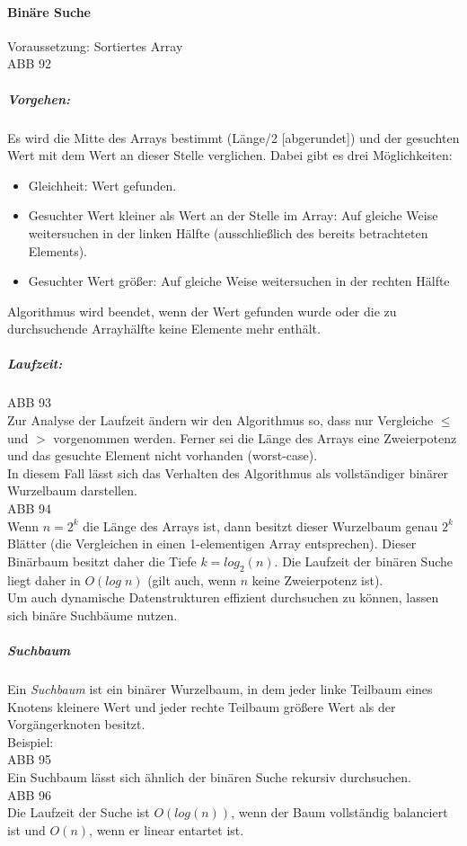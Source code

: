 \paragraph{Binäre Suche} Voraussetzung: Sortiertes Array\\
ABB 92
\subparagraph{Vorgehen:} 
Es wird die Mitte des Arrays bestimmt (Länge/2 [abgerundet]) und der gesuchten Wert mit dem Wert an dieser Stelle verglichen. Dabei gibt es drei Möglichkeiten:
\begin{itemize}
\item Gleichheit: Wert gefunden.
\item Gesuchter Wert kleiner als Wert an der Stelle im Array: Auf gleiche Weise weitersuchen in der linken Hälfte (ausschließlich des bereits betrachteten Elements).
\item Gesuchter Wert größer: Auf gleiche Weise weitersuchen in der rechten Hälfte
\end{itemize}
Algorithmus wird beendet, wenn der Wert gefunden wurde oder die zu durchsuchende Arrayhälfte keine Elemente mehr enthält.
\subparagraph{Laufzeit:}\parskp
ABB 93\\
Zur Analyse der Laufzeit ändern wir den Algorithmus so, dass nur Vergleiche $\leq$ und $>$ vorgenommen werden. Ferner sei die Länge des Arrays eine Zweierpotenz und das gesuchte Element nicht vorhanden (worst-case).\\
In diesem Fall lässt sich das Verhalten des Algorithmus als vollständiger binärer Wurzelbaum darstellen.\\
ABB 94\\
Wenn $n=2^k$ die Länge des Arrays ist, dann besitzt dieser Wurzelbaum genau $2^k$ Blätter (die Vergleichen in einen 1-elementigen Array entsprechen). Dieser Binärbaum besitzt daher die Tiefe $k=log_2(n)$. Die Laufzeit der binären Suche liegt daher in $O(log\;n)$ (gilt auch, wenn $n$ keine Zweierpotenz ist).\\
Um auch dynamische Datenstrukturen effizient durchsuchen zu können, lassen sich binäre Suchbäume nutzen.
\subparagraph{Suchbaum}
Ein \emph{Suchbaum} ist ein binärer Wurzelbaum, in dem jeder linke Teilbaum eines Knotens kleinere Wert und jeder rechte Teilbaum größere Wert als der Vorgängerknoten besitzt.\\
Beispiel:\\
ABB 95\\
Ein Suchbaum lässt sich ähnlich der binären Suche rekursiv durchsuchen.\\
ABB 96\\
Die Laufzeit der Suche ist $O(log(n))$, wenn der Baum vollständig balanciert ist und $O(n)$, wenn er linear entartet ist.

